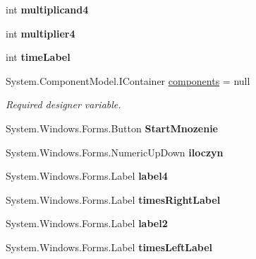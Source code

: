 \begin{DoxyCompactItemize}
int {\bfseries multiplicand4}
\item 
\mbox{\label{class_quiz___matematyczny_1_1_mnozenie_a18f8929dff4c6fa50896486729d9a48b}} 
int {\bfseries multiplier4}
\item 
\mbox{\label{class_quiz___matematyczny_1_1_mnozenie_a42dd216c5e4f79e2ab8fa43a0469173c}} 
int {\bfseries time\+Label}
\item 
System.\+Component\+Model.\+I\+Container \mbox{\hyperlink{class_quiz___matematyczny_1_1_mnozenie_a4268b571f886b6a6d054c3812ddcdc9d}{components}} = null
\begin{DoxyCompactList}\small\item\em Required designer variable. \end{DoxyCompactList}\item 
\mbox{\label{class_quiz___matematyczny_1_1_mnozenie_aa3b4ad61d135f22258722e763179f865}} 
System.\+Windows.\+Forms.\+Button {\bfseries Start\+Mnozenie}
\item 
\mbox{\label{class_quiz___matematyczny_1_1_mnozenie_a785fb12505720f3f5bf21087076b04e2}} 
System.\+Windows.\+Forms.\+Numeric\+Up\+Down {\bfseries iloczyn}
\item 
\mbox{\label{class_quiz___matematyczny_1_1_mnozenie_a5ffecab569b3778ba8afd19ba6b1262d}} 
System.\+Windows.\+Forms.\+Label {\bfseries label4}
\item 
\mbox{\label{class_quiz___matematyczny_1_1_mnozenie_a883163fec942228f0bafa24d41d49fd5}} 
System.\+Windows.\+Forms.\+Label {\bfseries times\+Right\+Label}
\item 
\mbox{\label{class_quiz___matematyczny_1_1_mnozenie_a5e54c4f4b85714a66f1b7437c904db40}} 
System.\+Windows.\+Forms.\+Label {\bfseries label2}
\item 
\mbox{\label{class_quiz___matematyczny_1_1_mnozenie_a0c02c2ddf6cdc9457d22ceb593f7ed5c}} 
System.\+Windows.\+Forms.\+Label {\bfseries times\+Left\+Label}

\end{DoxyCompactItemize}
